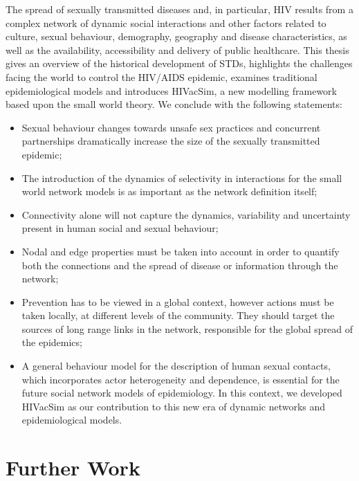 The spread of sexually transmitted diseases and, in particular, HIV results from a
complex network of dynamic social interactions and other factors related to culture,
sexual behaviour, demography, geography and disease characteristics, as well as the
availability, accessibility and delivery of public healthcare. This thesis gives an
overview of the historical development of STDs, highlights the challenges facing the
world to control the HIV/AIDS epidemic, examines traditional epidemiological models and
introduces HIVacSim, a new modelling framework based upon the small world theory. We
conclude with the following statements:
\begin{itemize}
    \item Sexual behaviour changes towards unsafe sex practices and concurrent partnerships
    dramatically increase the size of the sexually transmitted epidemic;

    \item The introduction of the dynamics of selectivity in interactions for the small
    world network models is as important as the network definition itself;

    \item Connectivity alone will not capture the dynamics, variability and uncertainty
    present in human social and sexual behaviour;

    \item Nodal and edge properties must be taken into account in order to quantify both
    the connections and the spread of disease or information through the network;

    \item Prevention has to be viewed in a global context, however actions must be taken
    locally, at different levels of the community. They should target the sources of long
    range links in the network, responsible for the global spread of the epidemics;

    \item A general behaviour model for the description of human sexual contacts, which
    incorporates actor heterogeneity and dependence, is essential for the future social
    network models of epidemiology. In this context, we developed HIVacSim as our
    contribution to this new era of dynamic networks and epidemiological models.
\end{itemize}

\newpage
\section{Further Work}

